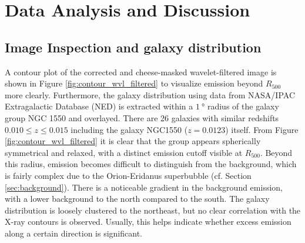 
\chapter{Data Analysis and Discussion}
\label{sec:data_analysis}
\section{Image Inspection and galaxy distribution}\label{sec:image_inspection}
%
A contour plot of the corrected and cheese-masked wavelet-filtered image is shown in Figure \ref{fig:contour_wvl_filtered} to visualize emission beyond \(R_{500}\) more clearly. Furthermore, the galaxy distribution using data from NASA/IPAC Extragalactic Database (NED) is extracted within a \(\SI{1}{\degree}\) radius of the galaxy group NGC 1550 and overlayed. There are 26 galaxies with similar redshifts \(0.010 \leq z \leq 0.015\) including the galaxy NGC1550 (\(z=0.0123\)) itself. From Figure \ref{fig:contour_wvl_filtered} it is clear that the group appears spherically symmetrical and relaxed, with a distinct emission cutoff visible at \(R_{500}\). Beyond this radius, emission becomes difficult to distinguish from the background, which is fairly complex due to the Orion-Eridanus superbubble (cf. Section \ref{sec:background}). There is a noticeable gradient in the background emission, with a lower background to the north compared to the south. The galaxy distribution is loosely clustered to the northeast, but no clear correlation with the X-ray contours is observed. Usually, this helps indicate whether excess emission along a certain direction is significant.

